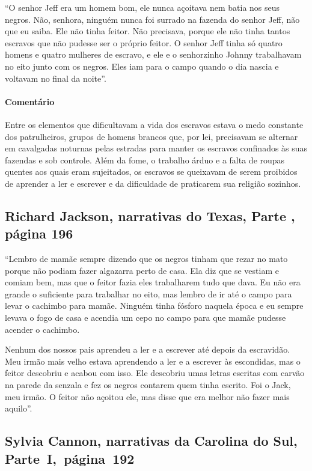 ``O senhor Jeff era um homem bom, ele nunca açoitava nem batia nos seus
negros. Não, senhora, ninguém nunca foi surrado na fazenda do senhor
Jeff, não que eu saiba. Ele não tinha feitor. Não precisava, porque ele
não tinha tantos escravos que não pudesse ser o próprio feitor. O senhor
Jeff tinha só quatro homens e quatro mulheres de escravo, e ele e o
senhorzinho Johnny trabalhavam no eito junto com os negros. Eles iam para
o campo quando o dia nascia e voltavam no final da noite''.

\paragraph{Comentário}\quad
{\small
Entre os elementos que dificultavam a vida dos escravos estava o
medo constante dos patrulheiros, grupos de homens brancos que, por lei,
precisavam se alternar em cavalgadas noturnas pelas estradas para manter
os escravos confinados às suas fazendas e sob controle. Além da fome, o
trabalho árduo e a falta de roupas quentes aos quais eram sujeitados, os
escravos se queixavam de serem proibidos de aprender a ler e escrever e
da dificuldade de praticarem sua religião sozinhos.
}

\subsection{Richard Jackson, narrativas do Texas, Parte , página 196}
\label{ref162}

``Lembro de mamãe sempre dizendo que os negros tinham que rezar no mato
porque não podiam fazer algazarra perto de casa. Ela diz que se vestiam
e comiam bem, mas que o feitor fazia eles trabalharem tudo que dava. Eu
não era grande o suficiente para trabalhar no eito, mas lembro de ir até
o campo para levar o cachimbo para mamãe. Ninguém tinha fósforo naquela
época e eu sempre levava o fogo de casa e acendia um cepo no campo para
que mamãe pudesse acender o cachimbo.

Nenhum dos nossos pais aprendeu a ler e a escrever até depois da
escravidão. Meu irmão mais velho estava aprendendo a ler e a escrever às
escondidas, mas o feitor descobriu e acabou com isso. Ele descobriu umas
letras escritas com carvão na parede da senzala e fez os negros contarem
quem tinha escrito. Foi o Jack, meu irmão. O feitor não açoitou ele, mas
disse que era melhor não fazer mais aquilo''.

\subsection{Sylvia Cannon, narrativas da Carolina do Sul, Parte~I,~página~192} \label{ref45}

